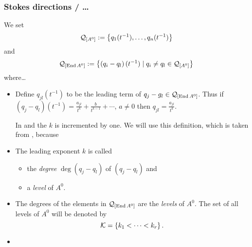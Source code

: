 \subsubsection{Stokes directions / \dots}
\begin{comment}
  \cite{Loday1994} \$I.4
\end{comment}
We set
\[
  \mathcal{Q}_{[A^0]}:=\left\{q_1(t^{-1}),\dots,q_n(t^{-1})\right\}
\]
and
\[
  \mathcal{Q}_{[\operatorname{End} A^0]}:=\left\{\left(q_i-q_l\right)(t^{-1})
    \mid q_i \neq q_l \in\mathcal{Q}_{[A^0]}
  \right\}
\]
where\dots
\begin{defn}
  \begin{itemize}
    \item Define $q_{jl}(t^{-1})$ to be the leading term of
      $q_j-g_l\in\mathcal{Q}_{[\operatorname{End} A^0]}$.  Thus if
      $(q_j-q_l)(t^{-1}) =\frac{a_{jl}}{t^k}+\frac{b}{t^{k-1}}+\cdots$,
      $a\neq0$ then $q_{jl}=\frac{a_{jl}}{t^k}$.
      \begin{comment}
        Thus if $(q_j-q_l)(t^{-1})=\frac{a_{jl}}{t^k}+h$ with $h\in o(t^{-k})$
        then $q_{jl}=\frac{a_{jl}}{t^k}$.
      \end{comment}
      \begin{rem}
        In \cite{boalch} and \cite{thboalch} the $k$ is incremented by one. We
        will use this definition, which is taken from \cite{Loday1994}, because
        \TODO
      \end{rem}
    \item The leading exponent $k$ is called
      \begin{itemize}
        \item the \emph{degree} $\deg(q_j-q_l)$ of $(q_j-q_l)$ and
        \item a \emph{level} of $A^0$.
      \end{itemize}
    \item The degrees of the elements in $\mathcal{Q}_{[\operatorname{End} A^0]}$ are the
      \emph{levels} of $A^0$.
      The set of all levels of $A^0$ will be denoted by
      \[
        \mathcal{K}=\{k_1<\dots<k_r\} \,.
      \]
      \begin{comment}
        \begin{rem}
          Levels are rational numbers. The unramified case is the case when
          all levels are integers.
          \TODO[Maby use definitions from \cite{Loday1994} p.857 in case of
            ramification]
        \end{rem}
      \end{comment}
    \item {}
  \end{itemize}
\end{defn}

